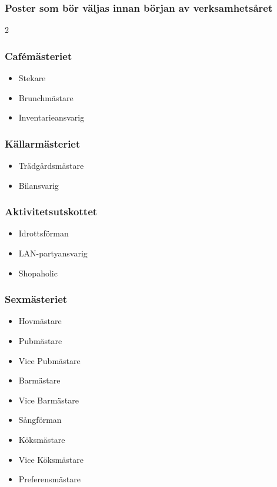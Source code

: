 \documentclass{dsekprotokoll}
\begin{document}
\subsubsection*{Poster som bör väljas innan början av verksamhetsåret}
\begin{multicols}{2}

    \subsubsection*{Cafémästeriet}
    \begin{itemize}
        \item Stekare
        \item Brunchmästare
        \item Inventarieansvarig
    \end{itemize}

    \subsubsection*{Källarmästeriet}
    \begin{itemize}
        \item Trädgårdsmästare
        \item Bilansvarig
    \end{itemize}

    \subsubsection*{Aktivitetsutskottet}
    \begin{itemize}
        \item Idrottsförman
        \item LAN-partyansvarig
        \item Shopaholic
    \end{itemize}


    \subsubsection*{Sexmästeriet}
    \begin{itemize}
        \item Hovmästare
        \item Pubmästare
        \item Vice Pubmästare
        \item Barmästare
        \item Vice Barmästare
        \item Sångförman
        \item Köksmästare
        \item Vice Köksmästare
        \item Preferensmästare
    \end{itemize}


\end{multicols}
\end{document}
